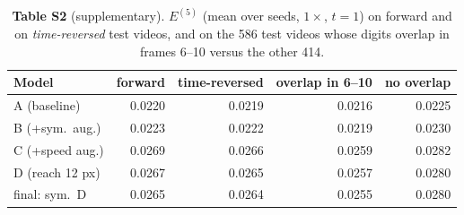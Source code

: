 \begin{table}[H]\centering\small
\caption*{\textbf{Table S2} (supplementary). $E^{(5)}$ (mean over seeds, $1\times$, $t=1$) on forward and on \emph{time-reversed} test videos, and on the 586 test videos whose digits overlap in frames 6--10 versus the other 414.}
\begin{tabular}{lrrrr}\toprule
Model & forward & time-reversed & overlap in 6--10 & no overlap \\ \midrule
A (baseline) & 0.0220 & 0.0219 & 0.0216 & 0.0225 \\
B (+sym.\ aug.) & 0.0223 & 0.0222 & 0.0219 & 0.0230 \\
C (+speed aug.) & 0.0269 & 0.0266 & 0.0259 & 0.0282 \\
D (reach 12 px) & 0.0267 & 0.0265 & 0.0257 & 0.0280 \\
final: sym.\ D & 0.0265 & 0.0264 & 0.0255 & 0.0280 \\
\bottomrule\end{tabular}\end{table}